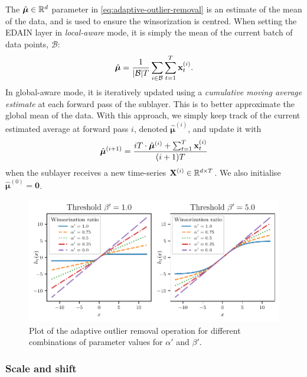 \documentclass{statsmsc}
\begin{document}
{The $\hat{\bm\mu}\in \mathbb{R}^d$ parameter in \cref{eq:adaptive-outlier-removal} is an estimate of the mean of the data, and is used
to ensure the winsorization is centred. When setting the \ac{EDAIN} layer in \textit{local-aware}
mode, it is simply the mean of the current batch of data points, $\mathcal{B}$:
\begin{equation}
    \hat{\bm\mu}=\frac{1}{|\mathcal{B}| T} \sum_{i \in \mathcal{B}} \sum_{t=1}^T \bfx_{t}^{(i)}. %
\end{equation}
In global-aware mode, it is iteratively updated using a \textit{cumulative
moving average estimate} at each forward pass of the sublayer.
This is to better approximate the global mean of the data.
With this approach, we simply keep track of the current estimated average at forward pass $i$,
denoted $\hat{\bm\mu}^{(i)}$, and update it with
\begin{equation}
    \hat{\bm\mu}^{(i+1)}= \frac{iT\cdot\hat{\bm\mu}^{(i)}+\sum^{T}_{t=1} \mathbf{x}_t^{(i)}}{(i+1)T}
\end{equation}
when the sublayer receives a new time-series $\mathbf{X}^{(i)}\in\mathbb{R}^{d\times T}$. We also initialise
$\hat{\bm\mu}^{(0)}=\mathbf{0}$.

\begin{figure}
\begin{center}
    \includegraphics[width=\textwidth]{figures/adaptive_outlier_removal.pdf}
\end{center}
\caption{Plot of the adaptive outlier removal operation for different combinations of parameter
values for $\alpha'$ and $\beta'$.}
\label{fig:adaptive_outlier}
\end{figure}



\subsubsection{Scale and shift}%
\label{ssub:Scale and shift}

}
\end{document}
